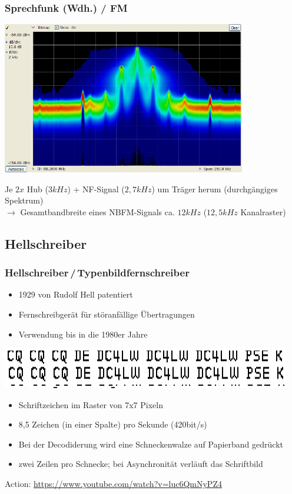 \begin{frame}
    \frametitle{Sprechfunk (Wdh.) / FM}

    \begin{center}
        \includegraphics[width=0.8\textwidth,height=.55\textheight,keepaspectratio]{e16/Dpx-fm-radio.png}
        \tiny \hyperlink{refs}{\cite{wc}}
    \end{center}

    Je $2x$ Hub ($3 kHz$) + NF-Signal ($2,7 kHz$) um Träger herum
    (durchgängiges Spektrum) \\[1em]
    
    $\rightarrow$ Gesamtbandbreite eines NBFM-Signals ca. $12 kHz$ ($12,5 kHz$
    Kanalraster)

\end{frame}

\subsection[Hell]{Hellschreiber}
\begin{frame}
  \frametitle{Hellschreiber\,/\,Typenbildfernschreiber}
  \begin{itemize}
    \item 1929 von Rudolf Hell patentiert
    \item Fernschreibgerät für störanfällige Übertragungen
    \item Verwendung bis in die 1980er Jahre
  \end{itemize}
  \begin{center}
    \includegraphics[width=.5\textwidth,height=.3\textheight,keepaspectratio]{e16/Hellschreiber.png}
  \end{center}
  \begin{itemize}
    \item Schriftzeichen im Raster von 7x7 Pixeln
    \item 8,5 Zeichen (in einer Spalte) pro Sekunde (420bit/s)
    \item Bei der Decodiderung wird eine Schneckenwalze auf Papierband gedrückt
    \item zwei Zeilen pro Schnecke; bei Asynchronität verläuft das Schriftbild
  \end{itemize}
  Action: \url{https://www.youtube.com/watch?v=luc6QmNyPZ4}
\end{frame}

